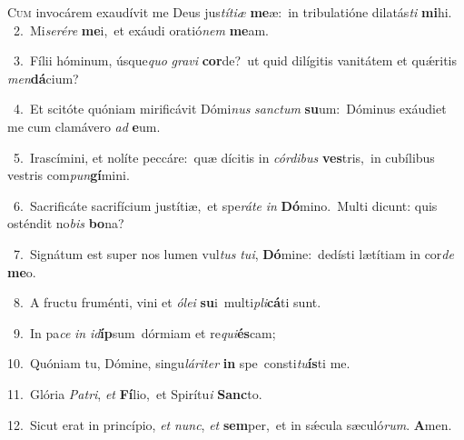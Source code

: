 \lettrine{\initial\textcolor{\initialcolor}{C}}{um} invocárem exaudívit me Deus jus\-\textit{tí}\-\textit{ti}\textit{æ} \textbf{me}\-æ:~\star in tribulatióne dilatás\textit{ti} \textbf{mi}\-hi.\\
{\numbfont\textcolor{\numbcolor}{~2.}}~Mi\-\textit{se}\-\textit{ré}\textit{re} \textbf{me}\-i,~\star et exáudi oratió\textit{nem} \textbf{me}\-am.\par
{\numbfont\textcolor{\numbcolor}{~3.}}~Fílii hóminum, úsque\textit{quo} \textit{gra}\-\textit{vi} \textbf{cor}\-de?~\star ut quid dilígitis vanitátem et quǽritis \textit{men}\-\textbf{dá}cium?\par
{\numbfont\textcolor{\numbcolor}{~4.}}~Et scitóte quóniam mirificávit Dómi\textit{nus} \textit{sanc}\-\textit{tum} \textbf{su}\-um:~\star Dóminus exáudiet me cum clamávero \textit{ad} \textbf{e}\-um.\par
{\numbfont\textcolor{\numbcolor}{~5.}}~Irascímini, et nolíte peccáre:~\dagger quæ dícitis in \textit{cór}\-\textit{di}\textit{bus} \textbf{ves}\-tris,~\star in cubílibus vestris com\-\textit{pun}\-\textbf{gí}mini.\par
{\numbfont\textcolor{\numbcolor}{~6.}}~Sacrificáte sacrifícium justítiæ,~\dagger et spe\-\textit{rá}\-\textit{te} \textit{in} \textbf{Dó}\-mino.~\star Multi dicunt: quis osténdit no\textit{bis} \textbf{bo}\-na?\par
{\numbfont\textcolor{\numbcolor}{~7.}}~Signátum est super nos lumen vul\textit{tus} \textit{tu}\-\textit{i}, \textbf{Dó}\-mine:~\star dedísti lætítiam in cor\textit{de} \textbf{me}\-o.\par
{\numbfont\textcolor{\numbcolor}{~8.}}~A fructu fruménti, vini et \textit{ó}\-\textit{le}\textit{i} \textbf{su}\-i~\star multi\-\textit{pli}\-\textbf{cá}ti sunt.\par
{\numbfont\textcolor{\numbcolor}{~9.}}~In pa\textit{ce} \textit{in} \textit{id}\-\textbf{íp}sum~\star dórmiam et re\-\textit{qui}\-\textbf{és}cam;\par
{\numbfont\textcolor{\numbcolor}{10.}}~Quóniam tu, Dómine, singu\-\textit{lá}\-\textit{ri}\textit{ter} \textbf{in} spe~\star consti\-\textit{tu}\-\textbf{ís}ti me.\par
{\numbfont\textcolor{\numbcolor}{11.}}~Glória \textit{Pa}\-\textit{tri}, \textit{et} \textbf{Fí}\-lio,~\star et Spirítu\textit{i} \textbf{Sanc}\-to.\par
{\numbfont\textcolor{\numbcolor}{12.}}~Sicut erat in princípio, \textit{et} \textit{nunc}\-, \textit{et} \textbf{sem}\-per,~\star et in sǽcula sæculó\-\textit{rum}\-. \textbf{A}\-men.\par
